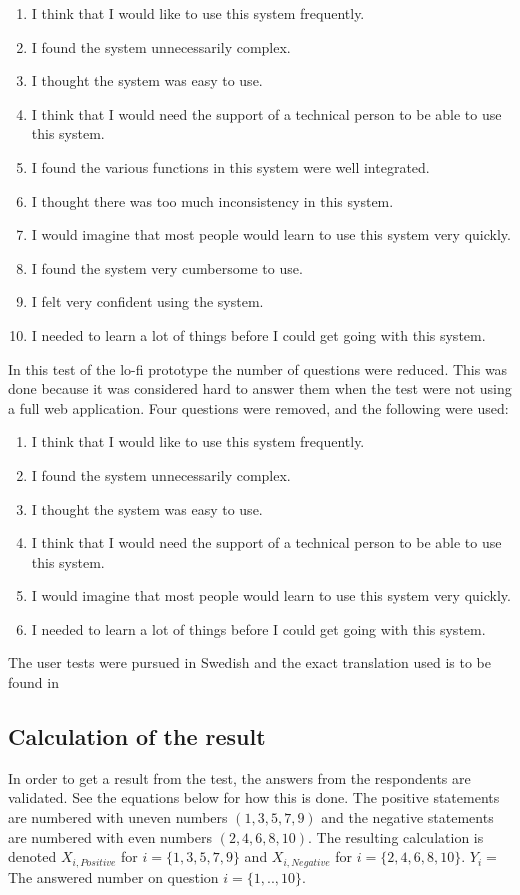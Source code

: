 \documentclass{article}
\begin{document}
	\begin{enumerate}
		\item I think that I would like to use this system frequently.
		\item I found the system unnecessarily complex.
		\item I thought the system was easy to use.
		\item I think that I would need the support of a technical person to be able to use this system.
		\item I found the various functions in this system were well integrated.
		\item I thought there was too much inconsistency in this system.
		\item I would imagine that most people would learn to use this system very quickly.
		\item I found the system very cumbersome to use.
		\item I felt very confident using the system.
		\item I needed to learn a lot of things before I could get going with this system.
	\end{enumerate}
	
	In this test of the lo-fi prototype the number of questions were reduced. This was done because it was considered hard to answer them when the test were not using a full web application. Four questions were removed, and the following were used: 
	
	\begin{enumerate}
		\item I think that I would like to use this system frequently.
		\item I found the system unnecessarily complex.
		\item I thought the system was easy to use.
		\item I think that I would need the support of a technical person to be able to use this system.
		\item I would imagine that most people would learn to use this system very quickly.
		\item I needed to learn a lot of things before I could get going with this system.
	\end{enumerate}

	The user tests were pursued in Swedish and the exact translation used is to be found in 
	
	\subsection{Calculation of the result} \label{Calculation}
	In order to get a result from the test, the answers from the respondents are validated. See the equations below for how this is done. The positive statements are numbered with uneven numbers $(1, 3, 5, 7, 9)$ and the negative statements are numbered with even numbers $(2, 4, 6, 8, 10)$. The resulting calculation is denoted $X_{i,Positive}$ for $ i = \{1,3,5,7,9\}$ and $X_{i,Negative}$ for $ i = \{2,4,6,8,10\}$. $Y_i = $ The answered number on question $ i = \{1,..,10\}$. 
	
\end{document}
